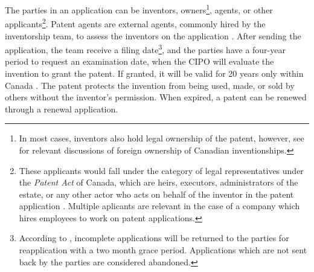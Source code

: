 \documentclass[../main.tex]{subfiles}
\begin{document}
The parties in an application can be inventors, owners\footnote{In most cases, inventors also hold legal ownership of the patent, however, see \textcite{alam_etal22, beaudry_schiffauerova11} for relevant discussions of foreign ownership of Canadian inventionships.}, agents, or other applicants\footnote{These applicants would fall under the category of legal representatives under the \textit{Patent Act} of Canada, which are heirs, executors, administrators of the estate, or any other actor who acts on behalf of the inventor in the patent application \parencite{Patent85}. Multiple aplicants are relevant in the case of a company which hires employees to work on patent applications.}. Patent agents are external agents, commonly hired by the inventorship team, to assess the inventors on the application \parencite{putnam06}. After sending the application, the team receive a filing date\footnote{According to \textcite{canadianintellectualpropertyoffice21}, incomplete applications will be returned to the parties for reapplication with a two month grace period. Applications which are not sent back by the parties are considered abandoned.}, and the parties have a four-year period to request an examination date, when the CIPO will evaluate the invention to grant the patent. If granted, it will be valid for 20 years only within Canada \parencite{abbes_etal22}. The patent protects the invention from being used, made, or sold by others without the inventor's permission. When expired, a patent can be renewed through a renewal application. 




\end{document}
